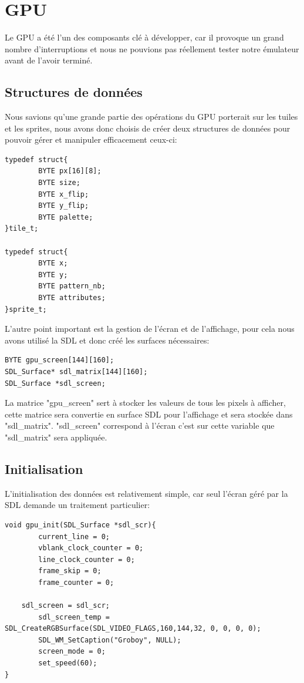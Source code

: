 \documentclass[french]{report}
\begin{document}
\section{GPU}
Le GPU a été l'un des composants clé à développer, car il provoque un grand nombre d'interruptions et nous ne pouvions pas réellement tester notre émulateur avant de l'avoir terminé.\\

\subsection{Structures de données}
	Nous savions qu'une grande partie des opérations du GPU porterait sur les tuiles et les sprites, nous avons donc choisis de créer deux structures de données pour pouvoir gérer et manipuler efficacement ceux-ci:\\ 
\begin{lstlisting}
typedef struct{
        BYTE px[16][8];
        BYTE size;
        BYTE x_flip;
        BYTE y_flip;
        BYTE palette;
}tile_t;

typedef struct{
        BYTE x;
        BYTE y;
        BYTE pattern_nb;
        BYTE attributes;
}sprite_t;
\end{lstlisting}

L'autre point important est la gestion de l'écran et de l'affichage, pour cela nous avons utilisé la SDL et donc créé les surfaces nécessaires:\\
\begin{lstlisting}
BYTE gpu_screen[144][160];
SDL_Surface* sdl_matrix[144][160];
SDL_Surface *sdl_screen;
\end{lstlisting}

La matrice "gpu\_screen" sert à stocker les valeurs de tous les pixels à afficher, cette matrice sera convertie en surface SDL pour l'affichage et sera stockée dans "sdl\_matrix". "sdl\_screen" correspond à l'écran c'est sur cette variable que "sdl\_matrix" sera appliquée.\\

\subsection{Initialisation}
	L'initialisation des données est relativement simple, car seul l'écran géré par la SDL demande un traitement particulier:\\
\begin{lstlisting}
void gpu_init(SDL_Surface *sdl_scr){
        current_line = 0;
        vblank_clock_counter = 0;
        line_clock_counter = 0;
        frame_skip = 0;
        frame_counter = 0;
        
	sdl_screen = sdl_scr;
        sdl_screen_temp = SDL_CreateRGBSurface(SDL_VIDEO_FLAGS,160,144,32, 0, 0, 0, 0);
        SDL_WM_SetCaption("Groboy", NULL);
        screen_mode = 0;
        set_speed(60);
}

\end{lstlisting}
\end{document}
